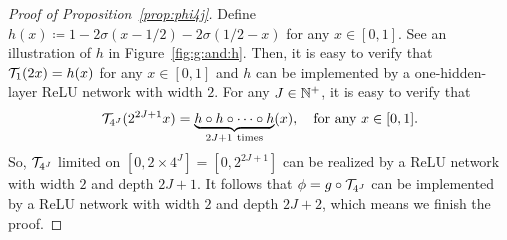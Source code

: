 \documentclass[nohyperref]{article}
\theoremstyle{plain}
\theoremstyle{definition}
\theoremstyle{remark}
\begin{document}
\begin{proof}[Proof of Proposition~\ref{prop:phi4j}]
	Define $h(x)\coloneqq 1-2\sigma(x-1/2)-2\sigma(1/2-x)$ for any $x\in [0,1]$. See an illustration of $h$ in Figure~\ref{fig:g:and:h}. Then, it is easy to verify that ${\mathcal{T}}_1(2x)=h(x)$ for any $x\in [0,1]$ and $h$ can be implemented by a one-hidden-layer ReLU network with width $2$.  For any $J\in\N^+$, it is easy to verify that
	\begin{equation*}
		\calT_{4^J}(2^{2J+1}x)=\underbrace{h\circ h\circ \cdots \circ h}_{2J+1\ \tn{times}}(x), \quad \tn{for any $x\in [0,1]$.}
	\end{equation*}
	So, ${\mathcal{T}}_{4^J}$ limited on $[0,2\times 4^J]=[0,2^{2J+1}]$ can be realized by a ReLU network with width $2$ and depth $2J+1$. It follows that $\phi=g\circ {\mathcal{T}}_{4^J}$ can be implemented by a ReLU network with width $2$ and depth $2J+2$, which means we finish the proof.
\end{proof}
\end{document}
